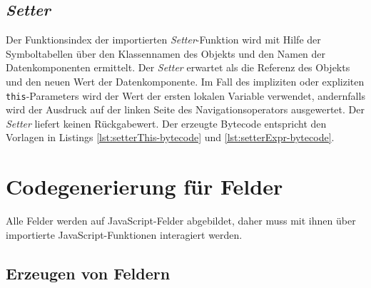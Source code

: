 



\subsection{\emph{Setter}}
\label{subsec:Zugriff-auf-Datenkomponenten-Setter}

Der Funktionsindex der importierten \emph{Setter}-Funktion wird mit Hilfe der Symboltabellen über den Klassennamen des Objekts und den Namen der Datenkomponenten ermittelt. Der \emph{Setter} erwartet als die Referenz des Objekts und den neuen Wert der Datenkomponente. Im Fall des impliziten oder expliziten \lstinline{this}-Parameters wird der Wert der ersten lokalen Variable verwendet, andernfalls wird der Ausdruck auf der linken Seite des Navigationsoperators ausgewertet. Der \emph{Setter} liefert keinen Rückgabewert. Der erzeugte Bytecode entspricht den Vorlagen in Listings \ref{lst:setterThis-bytecode} und \ref{lst:setterExpr-bytecode}.





\section{Codegenerierung für Felder}
Alle Felder werden auf JavaScript-Felder abgebildet, daher muss mit ihnen über importierte JavaScript-Funktionen interagiert werden.

\subsection{Erzeugen von Feldern}

